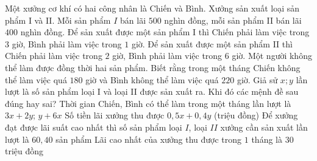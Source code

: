 \begin{ex}%
	Một xưởng cơ khí có hai công nhân là Chiến và Bình. Xưởng sản xuất loại sản phẩm I và II. Mỗi sản phẩm $I$ bán lãi $500$ nghìn đồng, mỗi sản phẩm II bán lãi $400$ nghìn đồng. Để sản xuất được một sản phẩm I thì Chiến phải làm việc trong $3$ giờ, Bình phải làm việc trong $1$ giờ. Để sản xuất được một sản phẩm II thì Chiến phải làm việc trong $2$ giờ, Bình phải làm việc trong $6$ giờ. Một người không thể làm được đồng thời hai sản phẩm. Biết rằng trong một tháng Chiến không thể làm việc quá $180$ giờ và Bình không thể làm việc quá $220$ giờ. Giả sử $x;y$ lần lượt là số sản phẩm loại I và loại II được sản xuất ra. Khi đó các mệnh đề sau đúng hay sai?
	\choiceTF
	{Thời gian Chiến, Bình có thể làm trong một tháng lần lượt là $3x+2y$; $y+6x$}
	{\True Số tiền lãi xưởng thu được $0{,}5x+0{,}4y$ (triệu đồng)}
	{\True Để xưởng đạt được lãi suất cao nhất thì số sản phẩm loại $I$, loại $II$ xưởng cần sản xuất lần lượt là $60{,}40$ sản phẩm}
	{Lãi cao nhất của xưởng thu được trong $1$ tháng là $30$ triệu đồng}
\end{ex}

